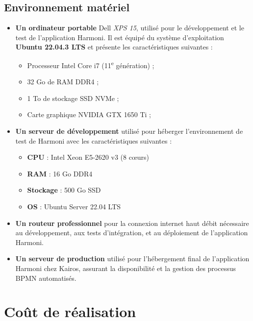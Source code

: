\subsection{Environnement matériel}

\begin{itemize}
    \item \textbf{Un ordinateur portable} Dell \textit{XPS 15}, utilisé pour le développement et le test de l'application Harmoni. Il est équipé du système d'exploitation \textbf{Ubuntu 22.04.3 LTS} et présente les caractéristiques suivantes :
    \begin{itemize}
        \item Processeur Intel Core i7 (11\textsuperscript{e} génération) ;
        \item 32 Go de RAM DDR4 ;
        \item 1 To de stockage SSD NVMe ;
        \item Carte graphique NVIDIA GTX 1650 Ti ;
    \end{itemize}
    
    \item \textbf{Un serveur de développement} utilisé pour héberger l'environnement de test de Harmoni avec les caractéristiques suivantes :
    \begin{itemize}
        \item \textbf{CPU} : Intel Xeon E5-2620 v3 (8 cœurs)
        \item \textbf{RAM} : 16 Go DDR4
        \item \textbf{Stockage} : 500 Go SSD
        \item \textbf{OS} : Ubuntu Server 22.04 LTS
    \end{itemize}
    
    \item \textbf{Un routeur professionnel} pour la connexion internet haut débit nécessaire au développement, aux tests d'intégration, et au déploiement de l'application Harmoni.
    
    \item \textbf{Un serveur de production} utilisé pour l'hébergement final de l'application Harmoni chez Kairos, assurant la disponibilité et la gestion des processus BPMN automatisés.
\end{itemize}

\section{Coût de réalisation}

